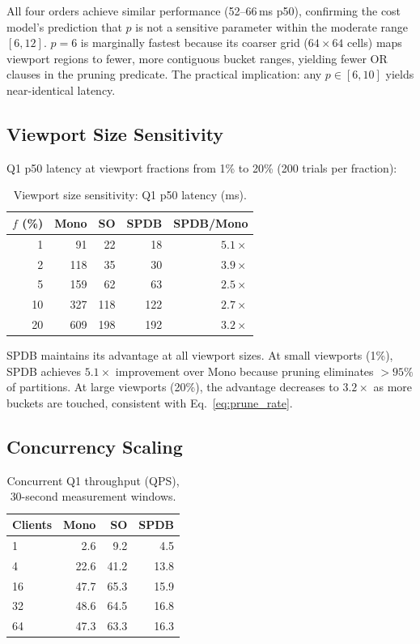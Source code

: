 \documentclass[sigconf]{acmart}
\begin{document}
All four orders achieve similar performance (52--66\,ms p50), confirming the cost model's prediction that $p$ is not a sensitive parameter within the moderate range $[6, 12]$.
$p = 6$ is marginally fastest because its coarser grid ($64 \times 64$ cells) maps viewport regions to fewer, more contiguous bucket ranges, yielding fewer OR clauses in the pruning predicate.
The practical implication: any $p \in [6, 10]$ yields near-identical latency.

\subsection{Viewport Size Sensitivity}

Q1 p50 latency at viewport fractions from 1\% to 20\% (200 trials per fraction):

\begin{table}[t]
\centering
\caption{Viewport size sensitivity: Q1 p50 latency (ms).}
\label{tab:viewport_sens}
\scriptsize
\begin{tabular}{@{}rrrrr@{}}
\toprule
$f$ (\%) & \textbf{Mono} & \textbf{SO} & \textbf{SPDB} & \textbf{SPDB/Mono} \\
\midrule
1 & 91 & 22 & 18 & $5.1\times$ \\
2 & 118 & 35 & 30 & $3.9\times$ \\
5 & 159 & 62 & 63 & $2.5\times$ \\
10 & 327 & 118 & 122 & $2.7\times$ \\
20 & 609 & 198 & 192 & $3.2\times$ \\
\bottomrule
\end{tabular}
\end{table}

SPDB maintains its advantage at all viewport sizes.
At small viewports (1\%), SPDB achieves $5.1\times$ improvement over Mono because pruning eliminates $>95\%$ of partitions.
At large viewports (20\%), the advantage decreases to $3.2\times$ as more buckets are touched, consistent with Eq.~\ref{eq:prune_rate}.

\subsection{Concurrency Scaling}

\begin{table}[t]
\centering
\caption{Concurrent Q1 throughput (QPS), 30-second measurement windows.}
\label{tab:concurrency}
\scriptsize
\begin{tabular}{@{}lrrr@{}}
\toprule
\textbf{Clients} & \textbf{Mono} & \textbf{SO} & \textbf{SPDB} \\
\midrule
1 & 2.6 & 9.2 & 4.5 \\
4 & 22.6 & 41.2 & 13.8 \\
16 & 47.7 & 65.3 & 15.9 \\
32 & 48.6 & 64.5 & 16.8 \\
64 & 47.3 & 63.3 & 16.3 \\
\bottomrule
\end{tabular}
\end{table}
\end{document}
